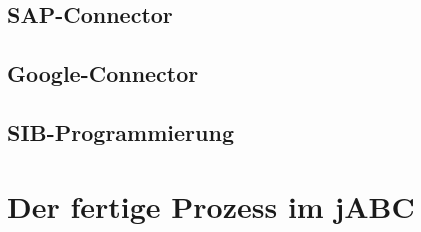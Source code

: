 




\subsection{SAP-Connector}


\subsection{Google-Connector}




\subsection{SIB-Programmierung}


\section{Der fertige Prozess im jABC}










